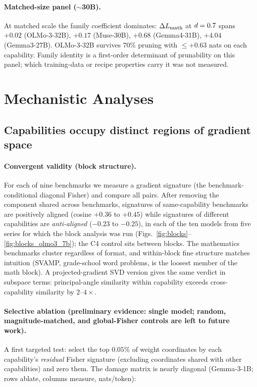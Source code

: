 \paragraph{Matched-size panel ($\sim$30B).} At matched scale the
family coefficient dominates: $\Delta L_{\text{math}}$ at $d=0.7$
spans $+0.02$ (OLMo-3-32B), $+0.17$ (Muse-30B), $+0.68$ (Gemma4-31B),
$+4.04$ (Gemma3-27B). OLMo-3-32B survives $70\%$ pruning with
$\le+0.63$ nats on each capability. Family identity is a first-order determinant of prunability on this panel; which training-data or recipe properties carry it was not measured.

\FloatBarrier
\section{Mechanistic Analyses}
\label{sec:app_mech}
\subsection{Capabilities occupy distinct regions of gradient space}
\label{sec:regions}

\paragraph{Convergent validity (block structure).} For each of nine
benchmarks we measure a gradient signature (the benchmark-conditional
diagonal Fisher) and compare all pairs. After removing the component
shared across benchmarks, signatures of same-capability benchmarks are
positively aligned (cosine $+0.36$ to $+0.45$) while signatures of
different capabilities are \emph{anti-aligned} ($-0.23$ to $-0.25$),
in each of the ten models from five series for which the block analysis was run
(Figs.~\ref{fig:blocks}--\ref{fig:blocks_olmo3_7b}); the C4 control sits between blocks.
 The
mathematics benchmarks cluster regardless of format, and within-block
fine structure matches intuition (SVAMP, grade-school word problems,
is the loosest member of the math block). A projected-gradient SVD
version gives the same verdict in subspace terms: principal-angle
similarity within capability exceeds cross-capability similarity by
$2$--$4\times$.



\paragraph{Selective ablation (preliminary evidence: single model; random, magnitude-matched, and global-Fisher controls are left to future work).} A first targeted test:
select the top $0.05\%$ of weight coordinates by each capability's
\emph{residual} Fisher signature (excluding coordinates shared with
other capabilities) and zero them. The damage matrix is nearly
diagonal (Gemma-3-1B; rows ablate, columns measure, nats/token):

